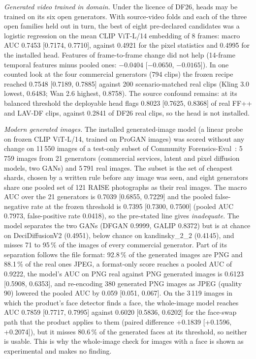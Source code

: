 \documentclass[conference,a4paper]{IEEEtran_nodash}
\begin{document}
\emph{Generated video trained in domain.} Under the licence of DF26, heads may be
trained on its six open generators. With source-video folds and each of the
three open families held out in turn, the best of eight pre-declared candidates
was a logistic regression on the mean CLIP ViT-L/14 embedding of 8 frames: macro
AUC 0.7453 [0.7174, 0.7710], against 0.4921 for the pixel statistics and 0.4995
for the installed head. Features of frame-to-frame change did not help (14-frame
temporal features minus pooled ones: $-0.0404$ [$-0.0650$, $-0.0165$]). In one
counted look at the four commercial generators (794 clips) the frozen recipe
reached 0.7548 [0.7189, 0.7885] against 200 scenario-matched real clips (Kling
3.0 lowest, 0.6483; Wan 2.6 highest, 0.8758). The source confound remains: at its
balanced threshold the deployable head flags 0.8023 [0.7625, 0.8368] of real
FF++ and LAV-DF clips, against 0.2841 of DF26 real clips, so the head is not
installed. %

\emph{Modern generated images.} The installed generated-image model (a linear
probe on frozen CLIP ViT-L/14, trained on ProGAN images) was scored without
any change on 11\,550 images of a test-only subset of
Community Forensics-Eval~\cite{park2025communityforensics}: 5\,759 images from
21 generators (commercial services, latent and pixel diffusion models, two GANs)
and 5\,791 real images. The subset is the set of cheapest shards, chosen by a
written rule before any image was seen, and eight generators share one pooled
set of 121 RAISE photographs as their real images. The macro AUC over the 21
generators is 0.7039 [0.6855, 0.7229] and the pooled false-negative rate at the
frozen threshold is 0.7395 [0.7300, 0.7500] (pooled AUC 0.7973, false-positive
rate 0.0418), so the pre-stated line gives \emph{inadequate}. The model separates
the two GANs (DFGAN 0.9999, GALIP 0.8372) but is at chance on DeciDiffusionV2
(0.4951), below chance on kandinsky\_2\_2 (0.4145), and misses 71 to 95\,\% of the
images of every commercial generator. Part of its separation follows the file
format: 92.8\,\% of the generated images are PNG and 88.1\,\% of the real ones
JPEG, a format-only score reaches a pooled AUC of 0.9222, the model's AUC on PNG
real against PNG generated images is 0.6123 [0.5908, 0.6353], and re-encoding 380
generated PNG images as JPEG (quality 90) lowered the pooled AUC by 0.059
[0.051, 0.067]. On the 3\,119 images in which the product's face detector finds a
face, the whole-image model reaches AUC 0.7859 [0.7717, 0.7995] against 0.6020
[0.5836, 0.6202] for the face-swap path that the product applies to them (paired
difference +0.1839 [+0.1596, +0.2074]), but it misses 80.6\,\% of the generated
faces at its threshold, so neither is usable. This is why the whole-image check
for images with a face is shown as experimental and makes no finding.
\end{document}
